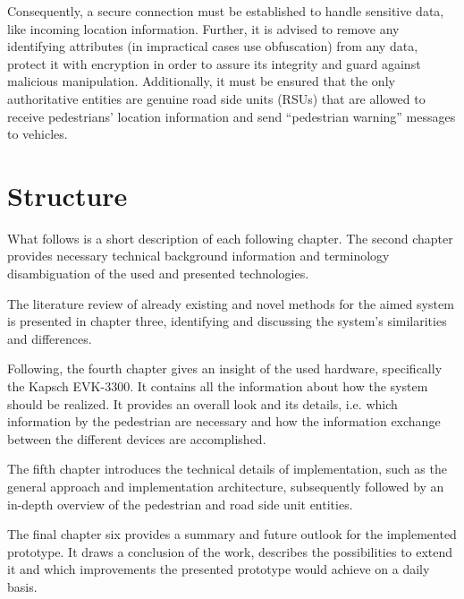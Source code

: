 Consequently, a secure connection must be established to handle sensitive data, like incoming location information.
Further, it is advised to remove any identifying attributes (in impractical cases use obfuscation) from any data, protect it with encryption in order to assure its integrity and guard against malicious manipulation.
Additionally, it must be ensured that the only authoritative entities are genuine road side units (RSUs) that are allowed to receive pedestrians' location information and send ``pedestrian warning'' messages to vehicles.



\section{Structure}
What follows is a short description of each following chapter. The second chapter provides necessary technical background information and terminology disambiguation of the used and presented technologies.

The literature review of already existing and novel methods for the aimed system is presented in chapter three, identifying and discussing the system's similarities and differences.

Following, the fourth chapter gives an insight of the used hardware, specifically the Kapsch EVK-3300. It contains all the information about how the system should be realized. It provides an overall look and its details, i.e. which information by the pedestrian are necessary and how the information exchange between the different devices are accomplished.
 
The fifth chapter introduces the technical details of implementation, such as the general approach and implementation architecture, subsequently followed by an in-depth overview of the pedestrian and road side unit entities.

The final chapter six provides a summary and future outlook for the implemented prototype. It draws a conclusion of the work, describes the possibilities to extend it and which improvements the presented prototype would achieve on a daily basis.